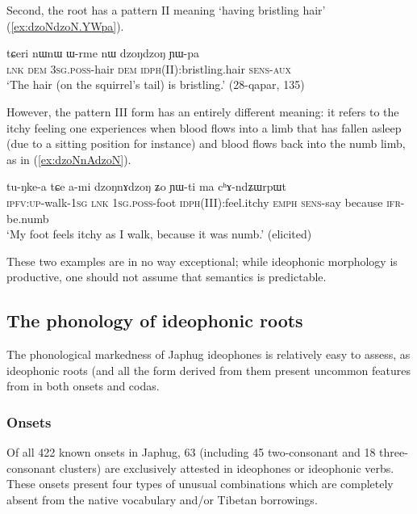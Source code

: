Second, the root  has a pattern II  meaning `having bristling hair' (\ref{ex:dzoNdzoN.YWpa}).
 
 \begin{exe} 
\ex  \label{ex:dzoNdzoN.YWpa}
\gll  tɕeri nɯnɯ ɯ-rme nɯ dzoŋdzoŋ ɲɯ-pa\\
\textsc{lnk} \textsc{dem} \textsc{3sg}.\textsc{poss}-hair \textsc{dem} \textsc{idph}(II):bristling.hair \textsc{sens}-\textsc{aux}\\
\glt `The hair (on the squirrel's tail) is bristling.' (28-qapar, 135)
 \end{exe}
 
 However, the pattern III form   has an entirely different meaning: it refers to the itchy feeling one experiences when blood flows into a limb that has fallen asleep (due to a sitting position for instance) and blood flows back into the numb limb, as in (\ref{ex:dzoNnAdzoN}).
 
\begin{exe} 
\ex  \label{ex:dzoNnAdzoN}
\gll tu-ŋke-a tɕe a-mi dzoŋnɤdzoŋ ʑo ɲɯ-ti ma cʰɤ-ndʑɯrpɯt  \\
\textsc{ipfv}:\textsc{up}-walk-\textsc{1sg} \textsc{lnk} 1\textsc{sg}.\textsc{poss}-foot \textsc{idph}(III):feel.itchy \textsc{emph} \textsc{sens}-say because \textsc{ifr}-be.numb \\
\glt `My foot feels itchy as I walk, because it was numb.' (elicited)
\end{exe}

These two examples are in no way exceptional; while ideophonic morphology is productive, one should not assume that semantics is predictable.

 \subsection{The phonology of ideophonic roots} \label{sec:ideophonic.roots}
The phonological markedness of Japhug ideophones is relatively easy to assess, as ideophonic roots (and all the form derived from them present uncommon features from in both onsets and codas.

\subsubsection{Onsets} \label{sec:idph.onsets}
Of all 422 known onsets in Japhug, 63 (including 45 two-consonant and 18 three-consonant clusters) are exclusively attested in ideophones or ideophonic verbs. These onsets present four types of unusual combinations  which are completely absent from the native vocabulary and/or Tibetan borrowings.

